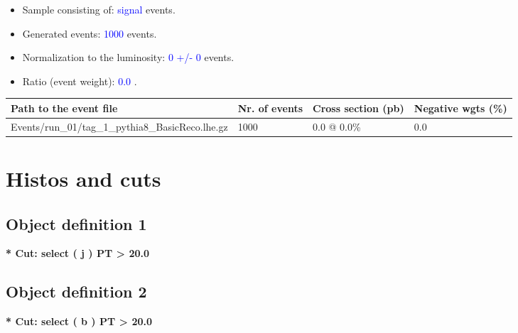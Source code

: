 \documentclass[a4paper, 10pt]{article}
\begin{document}
\begin{itemize}
  \item Sample consisting of: \textcolor{blue}{signal}  events.
   \item Generated events: \textcolor{blue}{1000 }  events.
   \item Normalization to the luminosity: \textcolor{blue}{0}\textcolor{blue}{ +/\-- }\textcolor{blue}{0 }  events.
   \item Ratio (event weight): \textcolor{blue}{0.0 } .  
 
\end{itemize}
\begin{table}[H]
  \begin{center}
    \begin{tabular}{|m{55.0mm}|m{25.0mm}|m{30.0mm}|m{30.0mm}|}
      \hline
      {\cellcolor{yellow}         Path to the event file}& {\cellcolor{yellow}         Nr. of events}& {\cellcolor{yellow}         Cross section (pb)}& {\cellcolor{yellow}         Negative wgts (\%)}\\
      \hline
      {\cellcolor{white}          Events/\-run\_01/\-tag\_1\_pythia8\_BasicReco.lhe.gz}& {\cellcolor{white}          1000}& {\cellcolor{white}          0.0 @ 0.0\%}& {\cellcolor{white}          0.0}\\
\hline
    \end{tabular}
  \end{center}
\end{table}

\newpage
\section{ Histos and cuts}

\subsection{ Object definition 1}

\textbf{* Cut: select ( j ) PT > 20.0}\\
   \subsection{ Object definition 2}

\textbf{* Cut: select ( b ) PT > 20.0}\\
\end{document}
